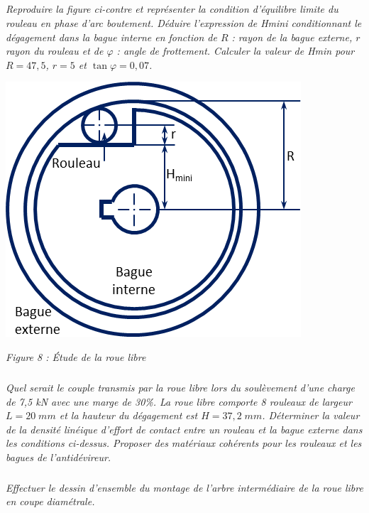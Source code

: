 \documentclass[10pt]{article}
\begin{document}
\begin{minipage}[c]{.6\linewidth}
\subparagraph{}
\textit{Reproduire la figure ci-contre et représenter la condition d'équilibre limite du rouleau en phase d'arc boutement. Déduire l'expression de Hmini conditionnant le dégagement dans la bague interne en fonction de $R$ : rayon de la bague externe, $r$ rayon du rouleau et de $\varphi$ : angle de frottement.
Calculer la valeur de Hmin pour $R=47,5$, $r=5$ et $\tan\varphi = 0,07$.}

\end{minipage} \hfill
\begin{minipage}[c]{.38\linewidth}
\begin{center}
\includegraphics[width=.95\textwidth]{images/rouelibre}

\textit{Figure 8 : Étude de la roue libre}
\end{center}
\end{minipage} 


\subparagraph{}
\textit{Quel serait le couple transmis par la roue libre lors du soulèvement d'une charge de 7,5 kN avec une marge de 30\%.
La roue libre comporte 8 rouleaux de largeur $L=20\;mm$ et la hauteur du dégagement est $H=37,2\; mm$. Déterminer la valeur de la densité linéique d'effort de contact entre un rouleau et la bague externe dans les conditions ci-dessus.
Proposer des matériaux cohérents pour les rouleaux et les bagues de l'antidévireur.}


\subparagraph{}
\textit{Effectuer le dessin d'ensemble du montage de l'arbre intermédiaire de la roue libre en coupe diamétrale.}
\end{document}
